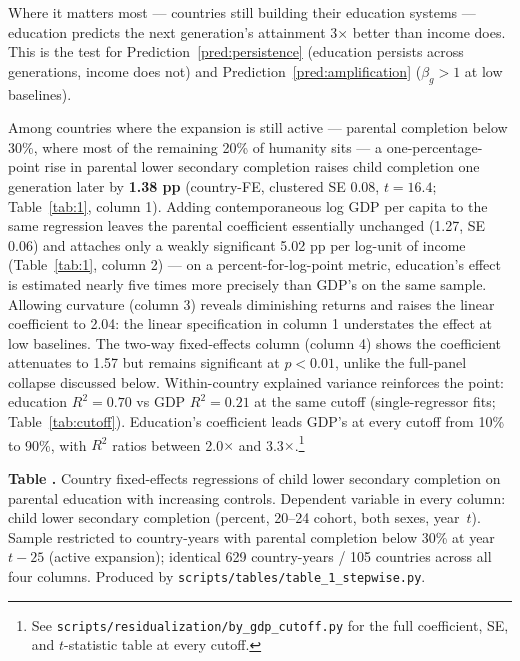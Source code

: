 \documentclass[12pt,letterpaper]{article}
\begin{document}
Where it matters most --- countries still building their education systems --- education predicts the next generation's attainment 3× better than income does. This is the test for Prediction~\ref{pred:persistence} (education persists across generations, income does not) and Prediction~\ref{pred:amplification} ($\beta_g > 1$ at low baselines).

Among countries where the expansion is still active --- parental
completion below 30\%, where most of the remaining 20\% of humanity
sits --- a one-percentage-point rise in parental lower secondary
completion raises child completion one generation later by
\textbf{1.38 pp} (country-FE, clustered SE 0.08, $t=16.4$;
Table~\ref{tab:1}, column 1). Adding contemporaneous log GDP per
capita to the same regression leaves the parental coefficient
essentially unchanged (1.27, SE 0.06) and attaches only a weakly
significant 5.02 pp per log-unit of income (Table~\ref{tab:1},
column 2) --- on a percent-for-log-point metric, education's effect is
estimated nearly five times more precisely than GDP's on the same
sample. Allowing curvature (column 3) reveals diminishing returns and
raises the linear coefficient to 2.04: the linear specification in
column 1 understates the effect at low baselines. The two-way
fixed-effects column (column 4) shows the coefficient attenuates to
1.57 but remains significant at $p<0.01$, unlike the full-panel
collapse discussed below. Within-country explained variance reinforces
the point: education $R^2=0.70$ vs GDP $R^2=0.21$ at the same cutoff
(single-regressor fits; Table~\ref{tab:cutoff}). Education's
coefficient leads GDP's at every cutoff from 10\% to 90\%, with $R^2$
ratios between 2.0$\times$ and 3.3$\times$.\footnote{See
\texttt{scripts/residualization/by\_gdp\_cutoff.py} for the full
coefficient, SE, and $t$-statistic table at every cutoff.}

\label{tab:1}\textbf{Table \thetable.} Country
fixed-effects regressions of child lower secondary completion on
parental education with increasing controls. Dependent variable in
every column: child lower secondary completion (percent, 20--24 cohort,
both sexes, year~$t$). Sample restricted to country-years with parental
completion below 30\% at year~$t-25$ (active expansion); identical 629
country-years / 105 countries across all four columns. Produced by
\texttt{scripts/tables/table\_1\_stepwise.py}.
\end{document}
